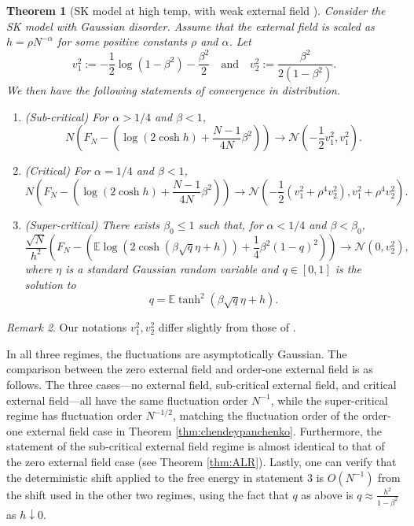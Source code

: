 \documentclass[11pt]{article}
\numberwithin{equation}{section}
\newcommand{\beq}{ \begin{equation} }
\newcommand{\eeq}{ \end{equation} }
\def \a {\alpha}
\def \b {\beta}
\newcommand{\bE}{\mathbb{E}}
\def \cN {\mathcal{N}}
\newtheorem{theorem}{Theorem}[section]
\theoremstyle{remark}
\newtheorem{remark}[theorem]{Remark}
\begin{document}
\begin{theorem}[SK model at high temp, with weak external field ]\label{thm:deywu23_SK} 
Consider the SK model with Gaussian disorder. Assume that the external field is scaled as $h = \rho N^{-\a}$ for some positive constants $\rho$ and $\a$. Let
\beq
v_1^2 := -\frac12\log(1-\b^2) - \frac{\b^2}{2} \quad \text{and} \quad v_2^2 := \frac{\b^2}{2(1-\b^2)}.
\eeq
We then have the following statements of convergence in distribution. 
\begin{enumerate}
     \item (Sub-critical) For $\a>1/4$ and $\b<1$,
        \[
        N \left(F_N - \left(\log(2\cosh h)+\frac{N-1}{4N}\b^2\right)\right) \to \cN(-\frac12 v_1^2, v_1^2).
        \]
        \item (Critical) For $\a=1/4$ and $\b<1$,
        \[
        N \left(F_N - \left(\log(2\cosh h)+\frac{N-1}{4N}\b^2\right)\right) \to \cN(-\frac12 \left(v_1^2 + \rho^4 v_2^2 \right), v_1^2+\rho^4 v_2^2).
        \]
        \item (Super-critical) There exists $\b_0\leq 1$ such that, for $\a<1/4$ and $\b<\b_0$,
        \[
        \frac{\sqrt{N}}{h^2}\left(F_N - \left(\bE \log(2\cosh(\b\sqrt{q}\eta+h))+\frac14\b^2(1-q)^2\right)\right) \to \cN(0,v_2^2),
        \]
        where $\eta$ is a standard Gaussian random variable and $q\in [0,1]$ is the solution to 
        \[
        q = \bE \tanh^2(\b \sqrt{q}\eta +h).
        \]
    \end{enumerate}
\end{theorem}

\begin{remark}
Our notations $v_1^2, v_2^2$ differ slightly from those of \cite{DeyWu23}.
\end{remark}

In all three regimes, the fluctuations are asymptotically Gaussian. The comparison between the zero external field and order-one external field is as follows. The three cases---no external field, sub-critical external field, and critical external field---all have the same fluctuation order $N^{-1}$, while the super-critical regime has fluctuation order $N^{-1/2}$, matching the fluctuation order of the order-one external field case in Theorem \ref{thm:chendeypanchenko}. Furthermore, the statement of the sub-critical external field regime is almost identical to that of the zero external field case (see Theorem \ref{thm:ALR}). Lastly, one can verify that the deterministic shift applied to the free energy in statement 3 is $O(N^{-1})$ from the shift used in the other two regimes, using the fact that $q$ as above is $q \approx \frac{h^2}{1-\b^2}$ as $h\downarrow 0$. 
\end{document}
